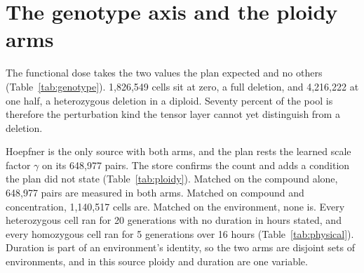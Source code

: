
\section{The genotype axis and the ploidy arms}
\label{sec:genotype}

The functional dose takes the two values the plan expected and no others
(Table~\ref{tab:genotype}). 1{,}826{,}549 cells sit at zero, a full deletion, and
4{,}216{,}222 at one half, a heterozygous deletion in a diploid. Seventy percent of the
pool is therefore the perturbation kind the tensor layer cannot yet distinguish from a
deletion.

\begin{table}[htbp]
\centering
\footnotesize
\caption{Genotype and dose per source. The functional dose is copies present over copies
in the reference. The dose basis is counted over cells that dose one compound. The molar
share is the cells whose concentration converts to molar without a molecular weight; the
plan's share is over records with a dosed compound, which is why Hillenmeyer's is higher.}
\label{tab:genotype}

\end{table}

Hoepfner is the only source with both arms, and the plan rests the learned scale factor
$\gamma$ on its 648{,}977 pairs. The store confirms the count and adds a condition the plan
did not state (Table~\ref{tab:ploidy}). Matched on the compound alone, 648{,}977 pairs are
measured in both arms. Matched on compound and concentration, 1{,}140{,}517 cells are.
Matched on the environment, none is. Every heterozygous cell ran for 20 generations with
no duration in hours stated, and every homozygous cell ran for 5 generations over 16
hours (Table~\ref{tab:physical}). Duration is part of an environment's identity, so the
two arms are disjoint sets of environments, and in this source ploidy and duration are one
variable.

\begin{table}[htbp]
\centering
\footnotesize
\caption{Hoepfner cells measured in both ploidy arms, at three levels of matching. The
limit is the correlation two noisy measurements of one quantity would show, the square
root of the product of the two arms' repeat reliabilities (Table~\ref{tab:reliability}).
Per compound is the median Spearman over compounds with at least 100 paired genes. A hit
is a paired cell in the bottom 5 percent of the homozygous arm, a shared hit is one that is
also in the bottom 5 percent of the heterozygous arm, and the last column is the shared
count expected if the two arms were independent.}
\label{tab:ploidy}

\end{table}

